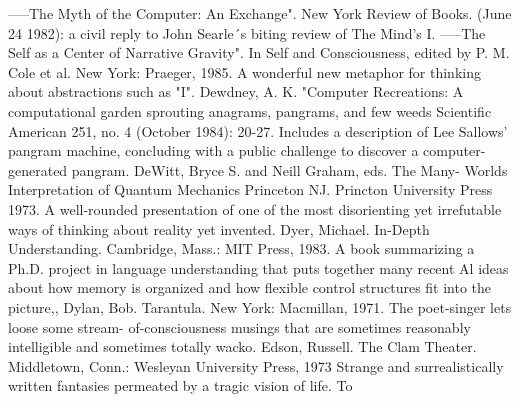 -----The Myth of the Computer: An Exchange". New York Review of Books. (June 24 1982):
  a civil reply to John Searle´s biting review of The Mind's I.
-----The Self as a Center of Narrative Gravity". In Self and Consciousness, edited by P. M.
  Cole et al. New York: Praeger, 1985. A wonderful new metaphor for thinking about
  abstractions such as "I".
Dewdney, A. K. "Computer Recreations: A computational garden sprouting anagrams,
  pangrams, and few weeds Scientific American 251, no. 4 (October 1984): 20-27. Includes a
  description of Lee Sallows' pangram machine, concluding with a public challenge to
  discover a computer-generated pangram.
DeWitt, Bryce S. and Neill Graham, eds. The Many- Worlds Interpretation of Quantum
  Mechanics Princeton NJ. Princton University Press 1973. A well-rounded presentation of
  one of the most disorienting yet irrefutable ways of thinking about reality yet invented.
Dyer, Michael. In-Depth Understanding. Cambridge, Mass.: MIT Press, 1983. A book
  summarizing a Ph.D. project in language understanding that puts together many recent Al
  ideas about how memory is organized and how flexible control structures fit into the
  picture,,
Dylan, Bob. Tarantula. New York: Macmillan, 1971. The poet-singer lets loose some stream-
  of-consciousness musings that are sometimes reasonably intelligible and sometimes totally
  wacko.
Edson, Russell. The Clam Theater. Middletown, Conn.: Wesleyan University Press, 1973
  Strange and surrealistically written fantasies permeated by a tragic vision of life. To



